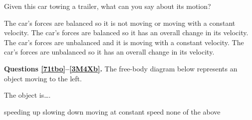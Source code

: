 \documentclass[answers]{exam}
\newif\ifversionKlevel
\begin{document}
\begin{questions}
\question
Given this car towing a trailer, what can you say about its motion?

\begin{center}
\end{center}

\begin{randomizechoices}
    \choice The car’s forces are balanced so it is not moving or moving with a constant velocity.
    \choice The car’s forces are balanced so it has an overall change in its velocity.
    \choice The car’s forces are unbalanced and it is moving with a constant velocity.
    \correctchoice The car’s forces are unbalanced so it has an overall change in its velocity.    
\end{randomizechoices}


\ifversionKlevel
\begin{EnvUplevel}
    \textbf{Questions \ref{71tbo}--\ref{3M4Xb}.} The free-body diagram below represents an object moving to the left.
\end{EnvUplevel}


\begin{center}
\end{center}

\question \label{71tbo}
The object is\dots .

\begin{randomizechoices}[keeplast]
    \choice speeding up
    \choice slowing down
    \correctchoice moving at constant speed 
    \choice none of the above
\end{randomizechoices}


\end{questions}
\end{document}

